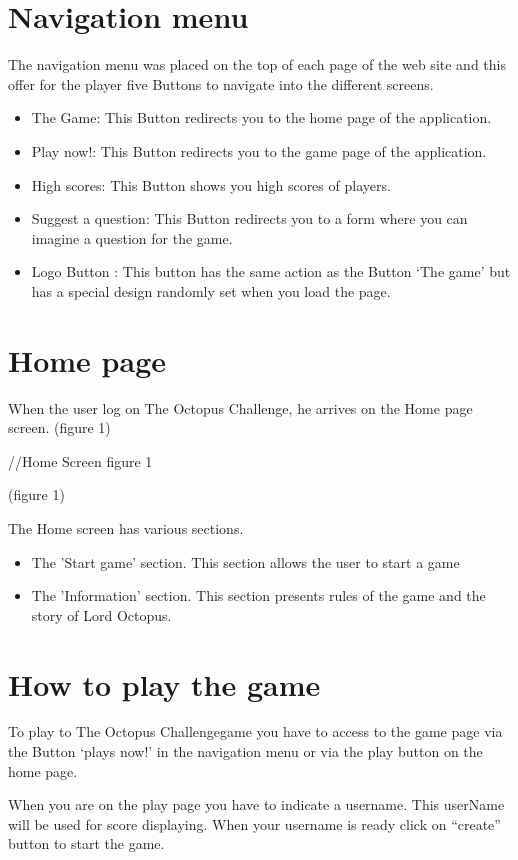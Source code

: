 \documentclass[a4paper,11pt, oneside]{book}
\def\appName{The Octopus Challenge}
\def\octopusName{Lord Octopus}
\begin{document}
	\section{Navigation menu}
	The navigation menu was placed on the top of each page of the web site and this offer for the player five Buttons to navigate into the different screens.
	\begin{itemize}
		\item The Game: This Button redirects you to the home page of the application.
		\item Play now!: This Button redirects you to the game page of the application.
		\item High scores: This Button shows you high scores of players.
		\item Suggest a question: This Button redirects you to a form where you can imagine a question for the game.
		\item Logo Button : This button has the same action as the Button ‘The game’ but has a special design randomly set when you load the page.
	\end{itemize}

	\section{Home page}

	When the user log on \appName, he arrives on the Home page screen.
(figure 1)

//Home Screen figure 1


(figure 1)

The Home screen has various sections.
\begin{itemize}
	\item The 'Start game' section. This section allows the user to start a game
	\item The 'Information' section. This section presents rules of the game and the story of \octopusName.
\end{itemize}


	\section{How to play the game}

	To play to \appName game you have to access to the game page via the Button ‘plays now!’ in the navigation menu or via the play button on the home page.

When you are on the play page you have to indicate a username.
This userName will be used for score displaying.
When your username is ready click on “create” button to start the game.
\end{document}
